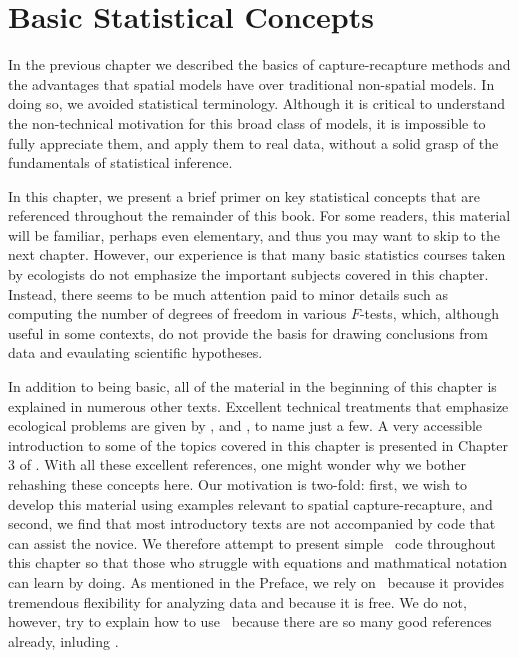 \chapter{
Basic Statistical Concepts
}
\label{chapt.modeling}


\vspace{.3in}

In the previous chapter we described the basics of capture-recapture
methods and the advantages that spatial models have over
traditional non-spatial models. In doing so, we avoided statistical
terminology. Although it is critical to
understand the non-technical motivation for this broad class of
models, it is impossible to fully appreciate them, and apply them to
real data, without a solid grasp of the fundamentals of statistical
inference.

In this chapter, we present a brief primer on key
statistical concepts that are referenced throughout the remainder of
this book. For some readers, this material will be familiar,
perhaps even elementary, and thus you may want to skip to the next
chapter. However, our experience is that many basic statistics courses
taken by ecologists do not emphasize the important subjects covered in
this chapter. Instead, there seems to be much attention paid to
minor details such as computing the number of degrees of freedom in
various $F$-tests, which, although useful in some contexts, do not
provide the basis for drawing conclusions from data and evaulating
scientific hypotheses. %

In addition to being basic, all of the material in the
beginning of this chapter is explained in numerous other
texts. %
Excellent technical treatments that emphasize ecological
problems are given by
\citet{williams_etal:2002}, \citet{royle_dorazio:2008} and
\citet{link_barker:2010}, to name just a few. A very accessible introduction to some of the
topics covered in this chapter is presented in Chapter 3 of
\citet{mackenzie_etal:2006}. With all these excellent references, one
might wonder why we bother rehashing these concepts here. Our motivation is
two-fold: first, we wish to develop this material using examples
relevant to spatial capture-recapture, and second, we find that most
introductory texts are not accompanied by code that can
assist the novice. We therefore attempt to present simple \R~code
throughout this chapter so that those who struggle with equations and
mathmatical notation can learn by doing. As mentioned in the Preface,
we rely on \R~because it provides tremendous flexibility for analyzing
data and because it is free. We do not, however, try to explain how to
use \R~because there are so many good references already, inluding
\citet{venables_ripley:2002,bolker:2008,venables_etal:2012}.


